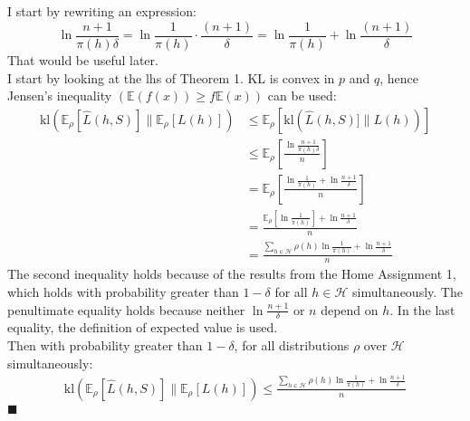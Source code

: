 \documentclass[a4paper]{article}
\newcommand{\expect}[1]{\mathbb{E}\left(#1\right)}
\newcommand*{\QEDA}{\hfill\ensuremath{\blacksquare}}%
\begin{document}
\subsection{}
\label{subsec:31}
I start by rewriting an expression:
\[
\ln \frac{n+1}{\pi(h) \delta} 
=\ln{\frac{1}{\pi(h)} \cdot \frac{(n+1)}{\delta}}
=\ln{\frac{1}{\pi(h)}} + \ln{\frac{(n+1)}{\delta}}
\]
That would be useful later. \\
I start by looking at the lhs of Theorem 1. KL is convex in $p$ and $q$, hence
Jensen's inequality $(\expect{f(x)} \geq f \expect{x})$ can be used:
\begin{align*}
\mathrm{kl}\left(\mathbb{E}_{\rho}[\hat{L}(h, S)] \|
\mathbb{E}_{\rho}[L(h)]\right) &\leq
\mathbb{E}_{\rho}[\mathrm{kl}(\hat{L}(h, S)] \| L(h))]\\
&\leq \mathbb{E}_{\rho}\left[\frac{\ln \frac{n+1}{\pi(h) \delta}}{n}\right]\\
&= \mathbb{E}_{\rho}\left[\frac{\ln{\frac{1}{\pi(h)}} + \ln{\frac{n+1}{\delta}}}{n}\right] \\
&= \frac{\mathbb{E}_{\rho}\left[\ln{\frac{1}{\pi(h)}}\right] + \ln{\frac{n+1}{\delta}}}{n} \\
&= \frac{\sum_{h \in \mathcal{H}}\rho(h)\ln{\frac{1}{\pi(h)}} + \ln{\frac{n+1}{\delta}}}{n}
\end{align*}
The second inequality holds because of the results from the Home Assignment 1,
which holds with probability greater than $1-\delta$ for all $h \in \mathcal{H}$
simultaneously.
The penultimate equality holds because neither $\ln{\frac{n+1}{\delta}}$ or $n$
depend on $h$. In the last equality, the definition of expected value is used.\\
Then with probability greater than $1-\delta$, for all distributions $\rho$
over $\mathcal{H}$ simultaneously:
\begin{align}
  \label{T1}
  \mathrm{kl}\left(\mathbb{E}_{\rho}[\hat{L}(h, S)] \|
  \mathbb{E}_{\rho}[L(h)]\right) \leq
  \frac{\sum_{h \in \mathcal{H}} \rho(h) \ln \frac{1}{\pi(h)}+\ln \frac{n+1}{\delta}}{n}
\end{align}
\QEDA
\end{document}
